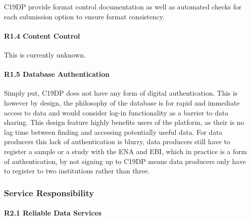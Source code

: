 \documentclass{article}
\begin{document}
C19DP provide format control documentation as well as automated checks
for each submission option to ensure format consistency.

\hypertarget{r1.4-content-control-1}{%
\paragraph{R1.4 Content Control}\label{r1.4-content-control-1}}

This is currently unknown.

\hypertarget{r1.5-database-authentication-1}{%
\paragraph{R1.5 Database
Authentication}\label{r1.5-database-authentication-1}}

Simply put, C19DP does not have any form of digital authentication. This
is however by design, the philosophy of the database is for rapid and
immediate access to data and would consider log-in functionality as a
barrier to data sharing. This design feature highly benefits users of
the platform, as their is no lag time between finding and accessing
potentially useful data. For data producers this lack of authentication
is blurry, data producers still have to register a sample or a study
with the ENA and EBI, which in practice is a form of authentication, by
not signing up to C19DP means data producers only have to register to
two institutions rather than three.

\hypertarget{service-responsibility-2}{%
\subsubsection{Service Responsibility}\label{service-responsibility-2}}

\hypertarget{r2.1-reliable-data-services-1}{%
\paragraph{R2.1 Reliable Data
Services}\label{r2.1-reliable-data-services-1}}
\end{document}
